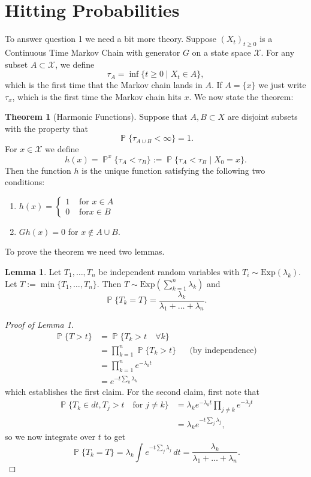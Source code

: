 \documentclass{article}
\theoremstyle{definition}
\newtheorem{lem}{Lemma}
\newtheorem{thm}{Theorem}
\DeclareMathOperator{\p}{\mathbb{P}}
\newcommand{\lr}[1]{\left(#1\right)}
\begin{document}
\section*{Hitting Probabilities} To answer question 1 we need a bit more theory. Suppose $(X_t)_{t\geq 0}$ is a Continuous Time Markov Chain with generator $G$ on a state space $\mathcal{X}$. For any subset $A \subset \mathcal{X}$, we define
\[
	\tau_A = \inf\{t\geq 0 \mid X_t \in A\},
\]
which is the first time that the Markov chain lands in $A$. If $A=\{x\}$ we just write $\tau_x$, which is the first time the Markov chain hits $x$. 
We now state the theorem:
\begin{thm}[Harmonic Functions] Suppose that $A,B\subset X$ are disjoint subsets with the property that 
\[
	\p\{ \tau_{A\cup B} <\infty\} = 1.
\]
For $x\in \mathcal{X}$ we define 
\[
	h(x) = \p^x \{\tau_A <\tau_B\} := \p\{\tau_A<\tau_B \mid X_0 = x\}.
\]
Then the function $h$ is the unique function satisfying the following two conditions:
\begin{enumerate}
	\item $
		h(x) = \begin{cases}
			1 & \text{ for } x \in A\\
			0 & \text{ for} x\in B
		\end{cases}
	$
	\item $Gh(x) = 0$ for $x\notin A\cup B$. 
\end{enumerate}
\end{thm}

To prove the theorem we need two lemmas.
\begin{lem}
Let $T_1,\dots, T_n$ be independent random variables with $T_i\sim \text{Exp}(\lambda_k)$. Let $T := \min\{T_1,\dots,T_n\}$. Then $T\sim \text{Exp}\lr{\sum_{k=1}^n \lambda_k}$ and 
\[
	\p\{T_k = T\} = \frac{\lambda_k}{\lambda_1+\dots+\lambda_n}.
\]
\end{lem}

\begin{proof}[Proof of Lemma 1]
	\begin{align*}
		\p\{T >t \} &= \p\{T_k > t \quad \forall k\}\\
		&= \prod_{k=1}^n \p\{T_k > t\} &&\text{(by independence)}\\
		&= \prod_{k=1}^n e^{-\lambda_k t} \\
		&= e^{-t \sum_{k}\lambda_k}
	\end{align*}
	which establishes the first claim. For the second claim, first note that
	\begin{align*}
		\p\{ T_k \in dt, T_j > t \quad \text{for } j\neq k\} &= \lambda_k e^{-\lambda_k t} \prod_{j\neq k} e^{-\lambda_j t}\\
		&= \lambda_k e^{-t \sum_j \lambda_j},
	\end{align*}
	so we now integrate over $t$ to get
	\[
		\p\{T_k = T\} = \lambda_k \int e^{-t \sum_j \lambda_j}\,dt = \frac{\lambda_k}{\lambda_1+\dots + \lambda_n}.
	\]
\end{proof}
\end{document}
